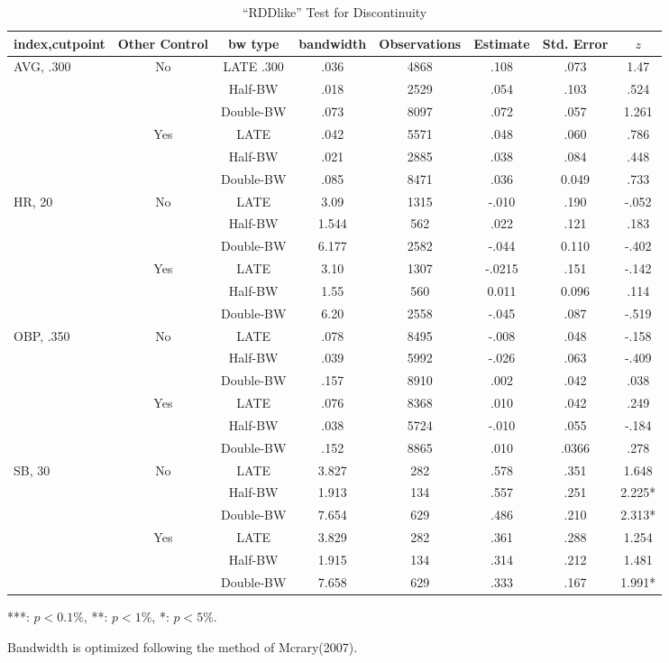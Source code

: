 \documentclass[dvipdfmx, 12pt]{article}
\begin{document}
\begin{landscape}
  \begin{table}[H]
    \small
    \centering
    \begin{tabular}{lccccccc}\hline
      index,cutpoint & Other Control & bw type & bandwidth
      & Observations & Estimate & Std. Error & $z$
      \\ \hline \hline
      AVG, .300 & No &LATE .300 & .036 & 4868 & .108 & .073 & 1.47 \\
      & &Half-BW &  .018 & 2529 & .054 & .103 & .524 \\
      & & Double-BW & .073 & 8097 & .072 & .057 & 1.261
      \\ \cline{3-8}
      & Yes & LATE & .042 & 5571 & .048 & .060 & .786 \\
      & & Half-BW & .021 & 2885 & .038 & .084 & .448 \\
      & & Double-BW & .085 & 8471 & .036 & 0.049 & .733
      \\ \hline
      HR, 20 & No & LATE & 3.09 & 1315 & -.010 & .190 & -.052 \\
      & & Half-BW & 1.544 & 562 & .022 & .121 & .183 \\
      & & Double-BW & 6.177 & 2582 & -.044 & 0.110 & -.402 \\ \cline{3-8}
      & Yes & LATE & 3.10& 1307 & -.0215 & .151 & -.142 \\
      & & Half-BW & 1.55 & 560 & 0.011 & 0.096 & .114 \\
      & & Double-BW & 6.20 & 2558 & -.045 & .087 & -.519 \\ \hline
      OBP, .350 & No &LATE & .078 & 8495 & -.008 & .048 & -.158 \\
      & & Half-BW & .039 & 5992 & -.026 & .063 & -.409 \\
      & & Double-BW & .157 & 8910 & .002 & .042 & .038 \\ \cline{3-8}
      & Yes & LATE & .076 & 8368 & .010 & .042 & .249 \\
      & & Half-BW & .038 & 5724 & -.010 & .055 & -.184 \\
      & &Double-BW & .152 & 8865 & .010 & .0366 & .278 \\ \hline
      SB, 30 & No & LATE & 3.827 & 282 & .578 & .351 & 1.648 \\
      & &Half-BW & 1.913 & 134 & .557 & .251 & 2.225* \\
      & &Double-BW & 7.654 & 629 & .486 & .210 & 2.313* \\ \cline{3-8}
      & Yes & LATE & 3.829 & 282 & .361 & .288 & 1.254 \\
      & & Half-BW & 1.915 & 134 & .314 & .212 & 1.481 \\
      & & Double-BW & 7.658 & 629 & .333 & .167 & 1.991* \\ \hline
    \end{tabular}
    \footnotesize
    \flushright
    ***: $p<0.1\%$, **: $p<1\%$, *: $p<5\%$.

    Bandwidth is optimized following the method of Mcrary(2007).
    \caption{``RDDlike'' Test for Discontinuity}
  \end{table}
\end{landscape}
\end{document}
